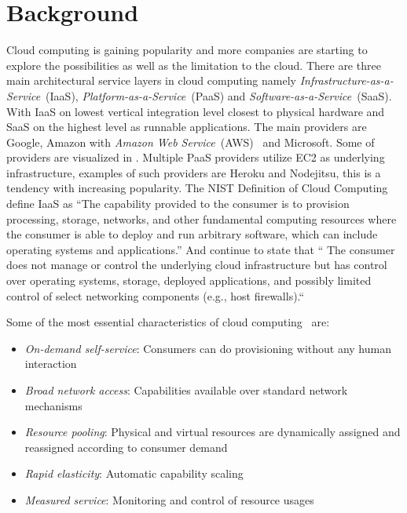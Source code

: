 \chapter{Background}




Cloud computing is gaining popularity and more companies are starting 
to explore the possibilities as well as the limitation to the cloud.
There are three main architectural service layers in cloud computing\cite{introduction:wozniak10}
namely \emph{Infrastructure-as-a-Service}~(IaaS), \emph{Platform-as-a-Service}~(PaaS)
and \emph{Software-as-a-Service}~(SaaS).
With IaaS on lowest vertical integration level closest to physical hardware and SaaS on the highest
level as runnable applications.
The main providers are Google, Amazon with \emph{Amazon Web Service}~(AWS)~\cite{aws} and Microsoft.
Some of providers are visualized in .
Multiple PaaS providers utilize EC2 as underlying infrastructure, examples of such
providers are Heroku and Nodejitsu, this is a tendency with increasing popularity.
The NIST Definition of Cloud Computing~\cite{nist:mell11} define IaaS as
``The capability provided to the consumer is to provision 
processing, storage, networks, and other fundamental computing resources where the 
consumer is able to deploy and run arbitrary software, which can include operating 
systems and applications.'' 
And continue to state that `` The consumer does not manage or control the underlying cloud 
infrastructure but has control over operating systems, storage, deployed applications, and 
possibly limited control of select networking components (e.g., host firewalls).``


Some of the most essential characteristics of cloud computing~\cite{nist:mell11} are:
\begin{itemize}
  \item \emph{On-demand self-service}: Consumers can do provisioning without any human interaction
  \item \emph{Broad network access}: Capabilities available over standard network mechanisms
  \item \emph{Resource pooling}: Physical and virtual resources are dynamically assigned
    and reassigned according to consumer demand
  \item \emph{Rapid elasticity}: Automatic capability scaling
  \item \emph{Measured service}: Monitoring and control of resource usages
\end{itemize}




